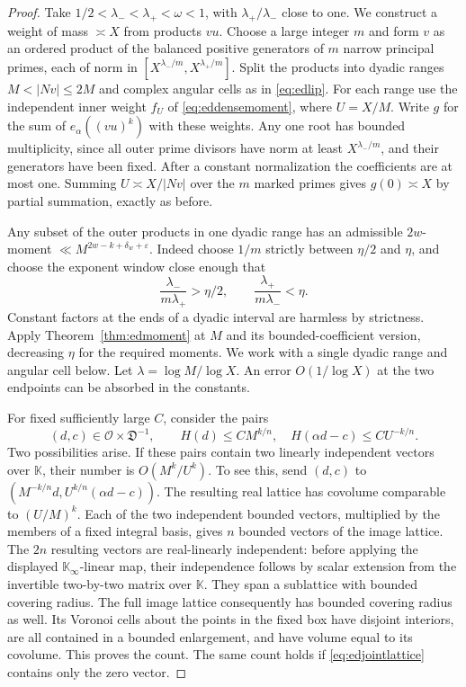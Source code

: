 \documentclass[11pt,letterpaper]{article}
\theoremstyle{definition}
\numberwithin{equation}{section}
\begin{document}
\begin{proof}
Take $1/2<\lambda_-<\lambda_+<\omega<1$, with
$\lambda_+/\lambda_-$ close to one. We construct a weight of mass
$\asymp X$ from products $vu$. Choose a large integer $m$ and form
$v$ as an ordered product of the balanced positive generators of
$m$ narrow principal primes, each of norm in
$[X^{\lambda_-/m},X^{\lambda_+/m}]$. Split the products into
dyadic ranges $M<|Nv|\le2M$ and complex angular cells as in
\eqref{eq:edlip}. For each range use the independent inner weight
$f_U$ of \eqref{eq:eddensemoment}, where $U=X/M$. Write $g$ for the
sum of $e_\alpha((vu)^k)$ with these weights. Any one root has bounded
multiplicity, since all outer prime divisors have norm at least
$X^{\lambda_-/m}$, and their generators have been fixed.
After a constant normalization the coefficients are at most one.
Summing $U\asymp X/|Nv|$ over the $m$ marked primes gives $g(0)\asymp X$
by partial summation, exactly as before.

Any subset of the outer products in one dyadic range has an
admissible $2w$-moment $\ll M^{2w-k+\delta_w+\varepsilon}$.
Indeed choose $1/m$ strictly between $\eta/2$ and $\eta$, and
choose the exponent window close enough that
\[
 \frac{\lambda_-}{m\lambda_+}>\eta/2,
 \qquad \frac{\lambda_+}{m\lambda_-}<\eta .
\]
Constant factors at the ends of a dyadic interval are harmless by
strictness. Apply Theorem~\ref{thm:edmoment} at $M$ and its
bounded-coefficient version, decreasing $\eta$ for the required
moments. We work with a single dyadic range and angular cell below.
Let $\lambda=\log M/\log X$. An error $O(1/\log X)$ at the two
endpoints can be absorbed in the constants.

For fixed sufficiently large $C$, consider the pairs
\begin{equation}\label{eq:edjointlattice}
 (d,c)\in\mathcal O\times\mathfrak D^{-1},\qquad
     H(d)\le CM^{k/n},\quad H(\alpha d-c)\le CU^{-k/n}.
\end{equation}
Two possibilities arise. If these pairs contain two linearly
independent vectors over $\mathbb K$, their number is
$O(M^k/U^k)$. To see this, send $(d,c)$ to
$(M^{-k/n}d,U^{k/n}(\alpha d-c))$. The resulting real lattice
has covolume comparable to $(U/M)^k$. Each of the two independent
bounded vectors, multiplied by the members of a fixed integral
basis, gives $n$ bounded vectors of the image lattice. The $2n$
resulting vectors are real-linearly independent: before applying
the displayed $\mathbb K_\infty$-linear map, their independence follows
by scalar extension from the invertible two-by-two matrix over
$\mathbb K$. They span a sublattice with bounded covering radius.
The full image lattice consequently has bounded covering radius as
well. Its Voronoi cells about the points in the fixed box have
disjoint interiors, are all contained in a bounded enlargement,
and have volume equal to its covolume. This proves the count.
The same count holds if \eqref{eq:edjointlattice} contains only the
zero vector.


\end{proof}
\end{document}
